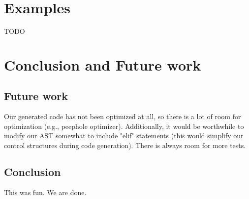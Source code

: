 \documentclass{article}
\begin{document}
\section{Examples}

TODO

\section{Conclusion and Future work}

\subsection{Future work}
Our generated code has not been optimized at all, so there is a lot of room for optimization (e.g., peephole optimizer). Additionally, it would be worthwhile to modify our AST somewhat to include "elif" statements (this would simplify our control structures during code generation). There is always room for more tests.

\subsection{Conclusion}

This was fun. We are done.
\end{document}
